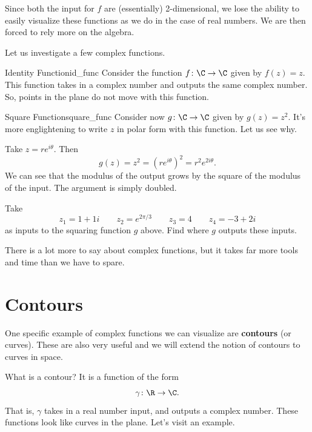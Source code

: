         \begin{remark}
        Since both the input for $f$ are (essentially) 2-dimensional, we lose the ability to easily visualize these functions as we do in the case of real numbers.  We are then forced to rely more on the algebra.
        \end{remark}
        
        Let us investigate a few complex functions.  
        
        \begin{ex}{Identity Function}{id_func}
        Consider the function $f\colon \C \to \C$ given by $f(z)=z$.  This function takes in a complex number and outputs the same complex number.  So, points in the plane do not move with this function.
        \end{ex}
        
        \begin{ex}{Square Function}{square_func}
        Consider now $g\colon \C \to \C$ given by $g(z)=z^2.$ It's more englightening to write $z$ in polar form with this function.  Let us see why.
        
        Take $z=re^{i\theta}$.  Then
        \[
        g(z)=z^2=\left( re^{i\theta}\right)^2=r^2e^{2i\theta}.
        \]
        We can see that the modulus of the output grows by the square of the modulus of the input.  The argument is simply doubled.  
        \end{ex}
        
        \begin{exercise}
        Take
        \[
        z_1=1+1i \qquad z_2=e^{2\pi/3} \qquad z_3=4 \qquad z_4=-3+2i 
        \]
        as inputs to the squaring function $g$ above.  Find where $g$ outputs these inputs.
        \end{exercise}
        
        There is a lot more to say about complex functions, but it takes far more tools and time than we have to spare.
        
        \section{Contours}
        One specific example of complex functions we can visualize are \textbf{contours} (or curves).  These are also very useful and we will extend the notion of contours to curves in space.
        
        What is a contour?  It is a function of the form
        \[
        \gamma \colon \R \to \C.
        \]
        That is, $\gamma$ takes in a real number input, and outputs a complex number.  These functions look like curves in the plane.  Let's visit an example.
        
